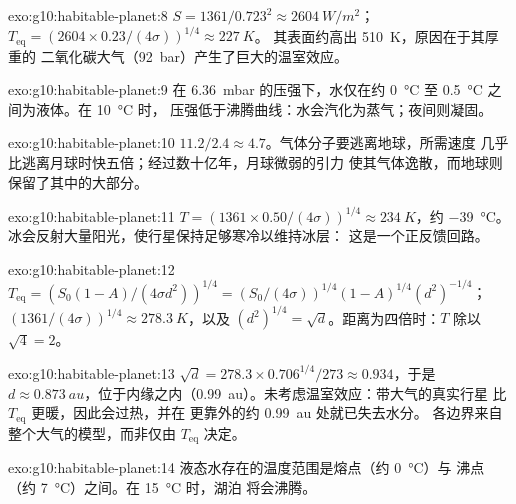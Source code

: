 \begin{solution}{exo:g10:habitable-planet:8}
$S = 1361/0.723^2 \approx \qty{2604}{W/m^2}$；
$T_{\mathrm{eq}} = (2604 \times 0.23/(4\sigma))^{1/4} \approx \qty{227}{K}$。
其表面约高出 \qty{510}{K}，原因在于其厚重的
二氧化碳大气（\qty{92}{bar}）产生了巨大的温室效应。
\end{solution}

\begin{solution}{exo:g10:habitable-planet:9}
在 \qty{6.36}{mbar} 的压强下，水仅在约 \qty{0}{\degreeCelsius}
至 \qty{0.5}{\degreeCelsius} 之间为液体。在 \qty{10}{\degreeCelsius} 时，
压强低于沸腾曲线：水会汽化为蒸气；夜间则凝固。
\end{solution}

\begin{solution}{exo:g10:habitable-planet:10}
$11.2/2.4 \approx 4.7$。气体分子要逃离地球，所需速度
几乎比逃离月球时快五倍；经过数十亿年，月球微弱的引力
使其气体逸散，而地球则保留了其中的大部分。
\end{solution}

\begin{solution}{exo:g10:habitable-planet:11}
$T = (1361 \times 0.50/(4\sigma))^{1/4} \approx \qty{234}{K}$，约
\qty{-39}{\degreeCelsius}。冰会反射大量阳光，使行星保持足够寒冷以维持冰层：
这是一个正反馈回路。
\end{solution}

\begin{solution}{exo:g10:habitable-planet:12}
$T_{\mathrm{eq}} = (S_0(1-A)/(4\sigma d^2))^{1/4} = (S_0/(4\sigma))^{1/4}
(1-A)^{1/4} (d^2)^{-1/4}$；$(1361/(4\sigma))^{1/4} \approx \qty{278.3}{K}$，以及
$(d^2)^{1/4} = \sqrt d$。距离为四倍时：$T$ 除以 $\sqrt 4 = 2$。
\end{solution}

\begin{solution}{exo:g10:habitable-planet:13}
$\sqrt d = 278.3 \times 0.706^{1/4}/273 \approx 0.934$，于是 $d \approx
\qty{0.873}{au}$，位于内缘之内（\qty{0.99}{au}）。未考虑温室效应：带大气的真实行星
比 $T_{\mathrm{eq}}$ 更暖，因此会过热，并在
更靠外的约 \qty{0.99}{au} 处就已失去水分。
各边界来自整个大气的模型，而非仅由 $T_{\mathrm{eq}}$ 决定。
\end{solution}

\begin{solution}{exo:g10:habitable-planet:14}
液态水存在的温度范围是熔点（约 \qty{0}{\degreeCelsius}）与
沸点（约 \qty{7}{\degreeCelsius}）之间。在 \qty{15}{\degreeCelsius} 时，湖泊
将会沸腾。
\end{solution}

